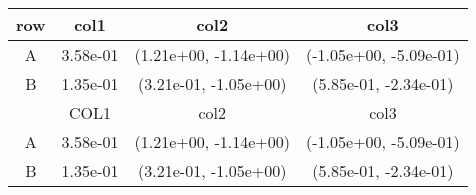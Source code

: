 \begin{tabular}{cccc}
\toprule
row&col1&col2&col3\tabularnewline
\midrule
A&3.58e-01& (1.21e+00, -1.14e+00)& (-1.05e+00, -5.09e-01)\tabularnewline
B&1.35e-01& (3.21e-01, -1.05e+00)& (5.85e-01, -2.34e-01)\tabularnewline
\midrule
&COL1&col2&col3\tabularnewline
\midrule
A&3.58e-01& (1.21e+00, -1.14e+00)& (-1.05e+00, -5.09e-01)\tabularnewline
B&1.35e-01& (3.21e-01, -1.05e+00)& (5.85e-01, -2.34e-01)\tabularnewline
\bottomrule
\end{tabular}
